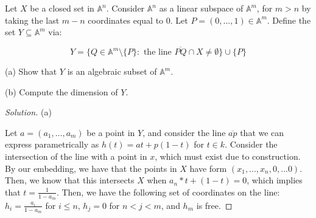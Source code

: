 \documentclass[10pt]{article}
\newenvironment{problem}[2][Problem]{\begin{trivlist}
\item[\hskip \labelsep {\bfseries #1}\hskip \labelsep {\bfseries #2.}]}{\end{trivlist}}
\begin{document}
\begin{problem}{3.2}

Let $X$ be a closed set in $\mathbb{A}^n$. Consider $\mathbb{A}^n$ as a linear subspace of $\mathbb{A}^m$, for $m > n$ by taking the last $m - n$ coordinates equal to $0$. Let $P = (0,...,1) \in \mathbb{A}^m$. Define the set $Y \subseteq \mathbb{A}^m$ via:

$$ Y = \{ Q \in \mathbb{A}^m \setminus \{ P \} : \text{ the line } \overline{PQ} \cap X \not = \emptyset \} \cup \{ P \}$$

(a) Show that $Y$ is an algebraic subset of $\mathbb{A}^m$.

(b) Compute the dimension of $Y$.

\end{problem}

\begin{proof}[Solution]

(a)

Let $a = (a_1,...,a_m)$ be a point in $Y$, and consider the line $\overline{ap}$ that we can express parametrically as $h(t) = at + p(1-t)$ for $t \in k$. Consider the intersection of the line with a point in $x$, which must exist due to construction. By our embedding, we have that the points in $X$ have form $(x_1,...,x_n,0,...0)$. Then, we know that this intersects $X$ when $a_n*t + (1-t) = 0$, which implies that $t = \frac{1}{1 - a_m}$. Then, we have the following set of coordinates on the line: $h_i = \frac{a_i}{1 - a_m}$ for $i \leq n$, $h_j = 0$ for $n < j < m$, and $h_m$ is free.


\end{proof}
\end{document}
